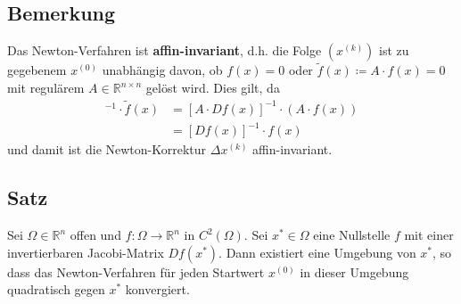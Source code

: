\documentclass[ngerman,fontsize=11pt, paper=a4, parskip=half, titlepage=true, toc=bib]{scrbook}
\newcommand{\R}{\mathds{R}}
\newcommand{\Ren}{\mathds{R}^{n}}
\newcommand{\Renn}{\mathds{R}^{n\times n}}
\begin{document}
		
 	\subsection{Bemerkung}\label{5.5.5}
 	Das Newton-Verfahren ist \textbf{affin-invariant},
 	d.h. die Folge $(x^{(k)})$ ist zu gegebenem $x^{(0)}$ unabhängig davon,
 	ob $f(x)=0$ oder $\widetilde{f}(x)\coloneqq A\cdot f(x) =0$
 	mit regulärem $A\in \Renn $ gelöst wird.
 	Dies gilt, da 
 	\begin{align*}
 		[D\widetilde{f}(x)]^{-1} \cdot \widetilde{f}(x)
 			&= [A\cdot Df(x)]^{-1} \cdot (A\cdot f(x))\\
 			&= [Df(x)]^{-1} \cdot f(x)
 	\end{align*}
 	und damit ist die Newton-Korrektur $\Delta x^{(k)}$ affin-invariant.
 	
 	\subsection{Satz}
 		Sei $\Omega\in\R^n$ offen und $f:\Omega\rightarrow\Ren$ in $C^2(\Omega)$.
 		Sei $x^{*}\in\Omega $ eine Nullstelle $f$ mit einer invertierbaren Jacobi-Matrix $Df(x^{*})$.
 		Dann existiert eine Umgebung von $x^{*}$, so dass das Newton-Verfahren 
 		für jeden Startwert $x^{(0)}$ in dieser Umgebung
 		quadratisch gegen $x^{*}$ konvergiert.
 		
\end{document}
